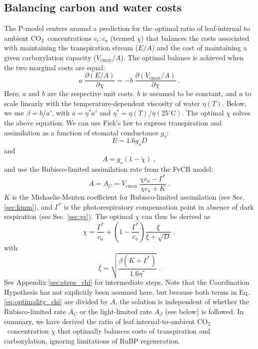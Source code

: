 \documentclass{myreport}
\newcommand{\coo}{CO$_2$}
\begin{document}
\subsection{Balancing carbon and water costs}
\label{sec:watercarbon}
The P-model centers around a prediction for the optimal ratio of leaf-internal to ambient \coo\ concentrations $c_i:c_a$ (termed $\chi$) that balances the costs associated with maintaining the transpiration stream ($E/A$) and the cost of maintaining a given carboxylation capacity ($V_{\mathrm{cmax}}/A$). The optimal balance is achieved when the two marginal costs are equal: 
\begin{equation}
\label{eq:optimality_chi}
a \; \frac{\partial (E/A)}{\partial \chi} = -b \; \frac{\partial (V_{\mathrm{cmax}}/A)}{\partial \chi}\;.
\end{equation}
Here, $a$ and $b$ are the respective unit costs. $b$ is assumed to be constant, and $a$ to scale linearly with the temperature-dependent viscosity of water $\eta(T)$. Below, we use $\beta = b / a'$, with $a = \eta^\ast a'$ and $\eta^\ast = \eta(T) / \eta(25^{\circ}\text{C})$. The optimal $\chi$ solves the above equation. We can use Fick's law \citep{fick1855} to express transpiration and assimilation as a function of stomatal conductance $g_s$: 
\begin{equation}
\label{eq:egs}
    E = 1.6 g_s D
\end{equation}
and 
\begin{equation}
\label{eq:ags}
    A = g_s (1-\chi) \;,
\end{equation}
and use the Rubisco-limited assimilation rate from the FvCB model:
\begin{equation}
\label{eq:ac}
    A = A_C = V_{\mathrm{cmax}} \; \frac{\chi c_a - \Gamma^{\ast}}{\chi c_a + K}\;.
\end{equation}
$K$ is the Michaelis-Menten coefficient for Rubisco-limited assimilation (see Sec. \ref{sec:kmm}), and $\Gamma^{\ast}$ is the photorespiratory compensation point in absence of dark respiration (see Sec. \ref{sec:gs}). The optimal $\chi$ can thus be derived as
\begin{equation}
\label{eq:chiopt}
\chi = \frac{\Gamma^{\ast}}{c_a} + \left(1- \frac{\Gamma^{\ast}}{c_a}\right) \frac{\xi}{\xi + \sqrt{D}}\;,
\end{equation}
with 
\begin{equation}
\label{eq:xi}
\xi = \sqrt{\frac{\beta (K+\Gamma^{\ast})}{1.6 \eta^{\ast}}}\;.
\end{equation}
See Appendix \ref{sec:steps_chi} for intermediate steps. Note that the Coordination Hypothesis has not explicitly been assumed here, but because both terms in Eq. \ref{eq:optimality_chi} are divided by $A$, the solution is independent of whether the Rubisco-limited rate $A_C$ or the light-limited rate $A_J$ (see below) is followed. In summary, we have derived the ratio of leaf internal-to-ambient \coo\ concentration $\chi$ that optimally balances costs of transpiration and carboxylation, ignoring limitations of RuBP regeneration.  
\end{document}
